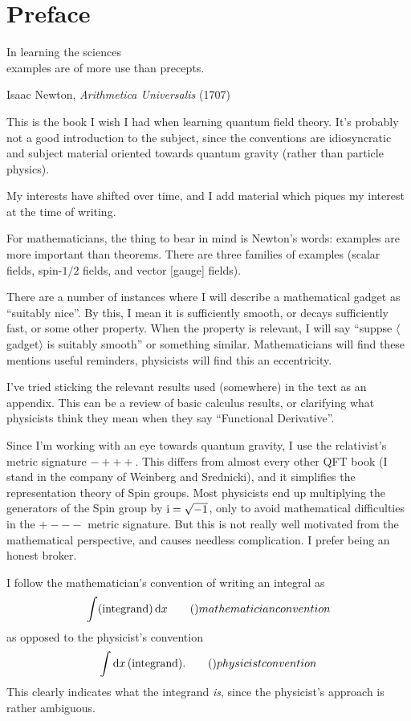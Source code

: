 \chapter*{Preface}

\epigraph{In learning the sciences\\
  examples are of more use than precepts.}%
{Isaac Newton, \textit{Arithmetica Universalis} (1707)}

\M
This is the book I wish I had when learning quantum field theory.
It's probably not a good introduction to the subject, since the
conventions are idiosyncratic and subject material oriented towards
quantum gravity (rather than particle physics).

My interests have shifted over time, and I add material which piques my
interest at the time of writing.

\M
For mathematicians, the thing to bear in mind is Newton's words:
examples are more important than theorems. There are three families of
examples (scalar fields, spin-$1/2$ fields, and vector [gauge] fields).


There are a number of instances where I will describe a mathematical
gadget as ``suitably nice''. By this, I mean it is sufficiently smooth,
or decays sufficiently fast, or some other property. When the property
is relevant, I will say ``suppse $\langle$gadget$\rangle$ is suitably smooth''
or something similar. Mathematicians will find these mentions useful
reminders, physicists will find this an eccentricity.

I've tried sticking the relevant results used (somewhere) in the text as
an appendix. This can be a review of basic calculus results, or
clarifying what physicists think they mean when they say ``Functional
Derivative''. 

Since I'm working with an eye towards quantum gravity, I use the
relativist's metric signature $-+++$. This differs from almost every
other QFT book (I stand in the company of Weinberg and Srednicki), and
it simplifies the representation theory of Spin groups. Most physicists
end up multiplying the generators of the Spin group by $\mathrm{i}=\sqrt{-1}$,
only to avoid mathematical difficulties in the $+---$ metric
signature. But this is not really well motivated from the mathematical
perspective, and causes needless complication. I prefer being an honest
broker.

I follow the mathematician's convention of writing an integral as
\[\int(\mbox{integrand})\,\D x\tag\mbox{mathematician convention}\]
as opposed to the physicist's convention
\[\int\D x\,(\mbox{integrand}).\tag\mbox{physicist convention}\]
This clearly indicates what the integrand \emph{is}, since the
physicist's approach is rather ambiguous.

